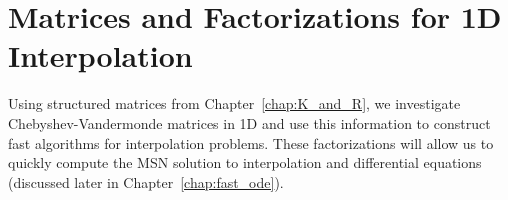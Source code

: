 \chapter{\CV{} Matrices and Factorizations for 1D Interpolation}
\label{chap:CV_mat_1D_I}

Using structured matrices from Chapter~\ref{chap:K_and_R},
we investigate Chebyshev-Vandermonde matrices
in 1D and use this information to construct
fast algorithms for interpolation problems.
These factorizations will allow us to quickly compute
the MSN solution to interpolation and differential equations
(discussed later in Chapter~\ref{chap:fast_ode}).

